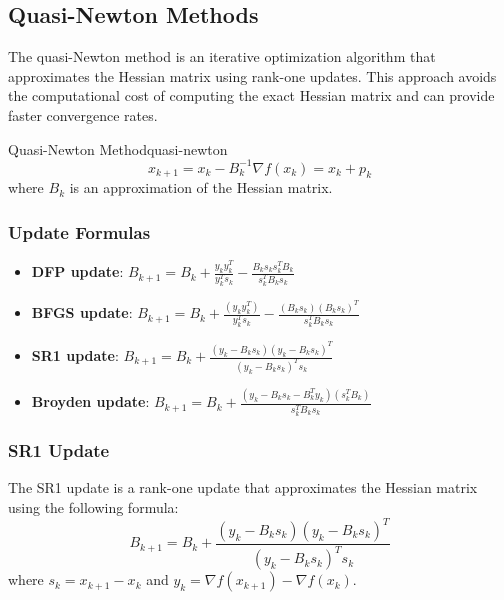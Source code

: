 \subsection*{Quasi-Newton Methods}
The quasi-Newton method is an iterative optimization algorithm that approximates the Hessian matrix using rank-one updates.
This approach avoids the computational cost of computing the exact Hessian matrix and can provide faster convergence rates.
\begin{definition}{Quasi-Newton Method}{quasi-newton}
  \[
    x_{k+1} = x_k - B_k^{-1} \nabla f(x_k) = x_k + p_k
  \]
  where \( B_k \) is an approximation of the Hessian matrix.
\end{definition}

\begin{algorithm}[H]
  \caption{Quasi-Newton Method}
  \label{alg:quasi-newton}
  \;
  \;
\end{algorithm}

\subsubsection*{Update Formulas}

\begin{itemize}
  \item \textbf{DFP update}: \( B_{k+1} = B_k + \frac{y_k y_k^T}{y_k^T s_k} - \frac{B_k s_k s_k^T B_k}{s_k^T B_k s_k} \)
  \item \textbf{BFGS update}: \( B_{k+1} = B_k + \frac{(y_k y_k^T)}{y_k^T s_k} - \frac{(B_k s_k)(B_k s_k)^T}{s_k^T B_k s_k} \)
  \item \textbf{SR1 update}: \( B_{k+1} = B_k + \frac{(y_k - B_k s_k)(y_k - B_k s_k)^T}{(y_k - B_k s_k)^T s_k} \)
  \item \textbf{Broyden update}: \( B_{k+1} = B_k + \frac{(y_k - B_k s_k - B_k^T y_k)(s_k^T B_k)}{s_k^T B_k s_k} \)
\end{itemize}

\subsubsection*{SR1 Update}
The SR1 update is a rank-one update that approximates the Hessian matrix using the following formula:
\[
  B_{k+1} = B_k + \frac{(y_k - B_k s_k)(y_k - B_k s_k)^T}{(y_k - B_k s_k)^T s_k}
\]
where \( s_k = x_{k+1} - x_k \) and \( y_k = \nabla f(x_{k+1}) - \nabla f(x_k) \).

